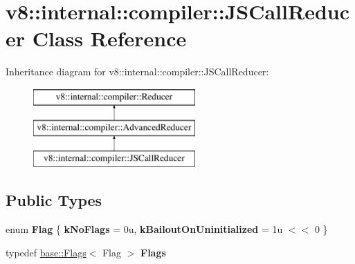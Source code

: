 \hypertarget{classv8_1_1internal_1_1compiler_1_1JSCallReducer}{}\section{v8\+:\+:internal\+:\+:compiler\+:\+:J\+S\+Call\+Reducer Class Reference}
\label{classv8_1_1internal_1_1compiler_1_1JSCallReducer}
Inheritance diagram for v8\+:\+:internal\+:\+:compiler\+:\+:J\+S\+Call\+Reducer\+:\begin{figure}[H]
\begin{center}
\leavevmode
\includegraphics[height=3.000000cm]{classv8_1_1internal_1_1compiler_1_1JSCallReducer}
\end{center}
\end{figure}
\subsection*{Public Types}
\begin{DoxyCompactItemize}
\item 
\mbox{\label{classv8_1_1internal_1_1compiler_1_1JSCallReducer_a6996f7826b08cb7b4ef61f9bd5874a9c}} 
enum {\bfseries Flag} \{ {\bfseries k\+No\+Flags} = 0u, 
{\bfseries k\+Bailout\+On\+Uninitialized} = 1u $<$$<$ 0
 \}
\item 
\mbox{\label{classv8_1_1internal_1_1compiler_1_1JSCallReducer_a920d8d4abde8cc564a01f8c7580a39d8}} 
typedef \mbox{\hyperlink{classv8_1_1base_1_1Flags}{base\+::\+Flags}}$<$ Flag $>$ {\bfseries Flags}
\end{DoxyCompactItemize}
